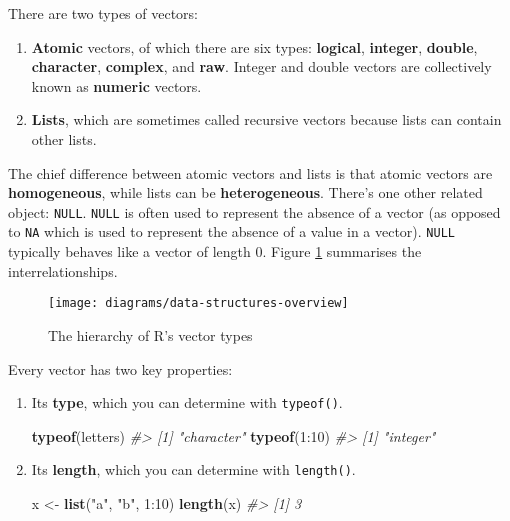 \documentclass[]{book}
\newenvironment{Shaded}{\begin{snugshade}}{\end{snugshade}}
\newcommand{\KeywordTok}[1]{\textcolor[rgb]{0.13,0.29,0.53}{\textbf{{#1}}}}
\newcommand{\DecValTok}[1]{\textcolor[rgb]{0.00,0.00,0.81}{{#1}}}
\newcommand{\StringTok}[1]{\textcolor[rgb]{0.31,0.60,0.02}{{#1}}}
\newcommand{\CommentTok}[1]{\textcolor[rgb]{0.56,0.35,0.01}{\textit{{#1}}}}
\newcommand{\NormalTok}[1]{{#1}}
\begin{document}
There are two types of vectors:

\begin{enumerate}
\def\labelenumi{\arabic{enumi}.}
\item
  \textbf{Atomic} vectors, of which there are six types:
  \textbf{logical}, \textbf{integer}, \textbf{double},
  \textbf{character}, \textbf{complex}, and \textbf{raw}. Integer and
  double vectors are collectively known as \textbf{numeric} vectors.
\item
  \textbf{Lists}, which are sometimes called recursive vectors because
  lists can contain other lists.
\end{enumerate}

The chief difference between atomic vectors and lists is that atomic
vectors are \textbf{homogeneous}, while lists can be
\textbf{heterogeneous}. There's one other related object: \texttt{NULL}.
\texttt{NULL} is often used to represent the absence of a vector (as
opposed to \texttt{NA} which is used to represent the absence of a value
in a vector). \texttt{NULL} typically behaves like a vector of length 0.
Figure \ref{fig:datatypes} summarises the interrelationships.

\begin{figure}

{\centering \texttt{[image: diagrams/data-structures-overview]} 

}

\caption{The hierarchy of R's vector types}\label{fig:datatypes}
\end{figure}

Every vector has two key properties:

\begin{enumerate}
\def\labelenumi{\arabic{enumi}.}
\item
  Its \textbf{type}, which you can determine with \texttt{typeof()}.

\begin{Shaded}
\begin{Highlighting}[]
\KeywordTok{typeof}\NormalTok{(letters)}
\CommentTok{#> [1] "character"}
\KeywordTok{typeof}\NormalTok{(}\DecValTok{1}\NormalTok{:}\DecValTok{10}\NormalTok{)}
\CommentTok{#> [1] "integer"}
\end{Highlighting}
\end{Shaded}
\item
  Its \textbf{length}, which you can determine with \texttt{length()}.

\begin{Shaded}
\begin{Highlighting}[]
\NormalTok{x <-}\StringTok{ }\KeywordTok{list}\NormalTok{(}\StringTok{"a"}\NormalTok{, }\StringTok{"b"}\NormalTok{, }\DecValTok{1}\NormalTok{:}\DecValTok{10}\NormalTok{)}
\KeywordTok{length}\NormalTok{(x)}
\CommentTok{#> [1] 3}
\end{Highlighting}
\end{Shaded}
\end{enumerate}
\end{document}
